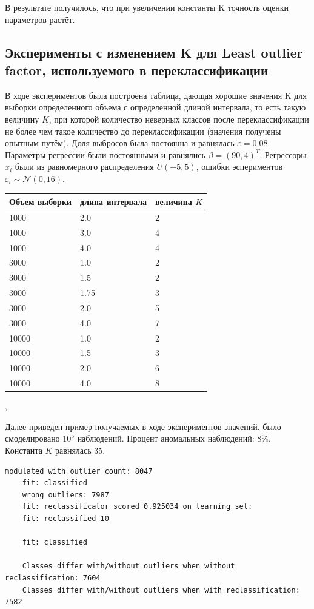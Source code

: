 В результате получилось, что при увеличении константы K точность оценки параметров растёт. 

\subsection{Эксперименты с изменением K для Least outlier factor, используемого в переклассификации}\label{ss3_3_2}
В ходе экспериментов была построена таблица, дающая хорошие значения K для выборки определенного объема с определенной длиной интервала, то есть такую величину $K$, при которой количество неверных классов после переклассификации не более чем такое количество до переклассификации (значения получены опытным путём).
 Доля выбросов была постоянна и равнялась $\widetilde{\varepsilon}=0.08$. Параметры регрессии были постоянными и равнялись $\beta=(90,4)^T$. 
Регрессоры $x_i$ были из равномерного распределения $U(-5,5)$, ошибки эспериментов $\varepsilon_i\sim \mathcal{N}(0,16)$.

\begin{center}
    \label{tab2}
    \begin{tabular}{|p{5cm}|p{5cm}|p{5cm}|}
        \hline
        Объем выборки&длина интервала& величина $K$\\
        \hline
        1000 & 2.0 & 2\\
        1000 & 3.0 & 4\\
        1000 & 4.0 & 4\\

        3000 & 1.0 & 2\\
        3000 & 1.5 & 2\\
        3000 & 1.75 & 3\\
        3000 & 2.0 & 5\\
        3000 & 4.0 & 7\\

        10000 & 1.0 & 2\\
        10000 & 1.5 & 3\\
        10000 & 2.0 & 6\\
        10000 & 4.0 & 8\\
        \hline
    \end{tabular},
\end{center}
Далее приведен пример получаемых в ходе экспериментов значений.
было смоделировано $10^5$ наблюдений. Процент аномальных наблюдений: $8\%$. Константа $K$ равнялась 35.
\begin{Verbatim}[fontsize=\scriptsize]
    modulated with outlier count: 8047
    fit: classified
    wrong outliers: 7987
    fit: reclassificator scored 0.925034 on learning set:
    fit: reclassified 10
    
    fit: classified
    
    Classes differ with/without outliers when without reclassification: 7604
    Classes differ with/without outliers when with reclassification: 7582
\end{Verbatim}

